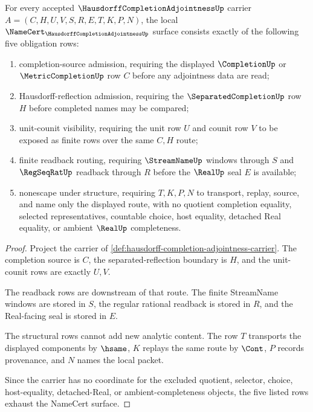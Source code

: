 \begin{theorem}
\label{thm:hausdorff-completion-adjointness-namecert-obligations}
For every accepted $\HausdorffCompletionAdjointnessUp$ carrier $A=(C,H,U,V,S,R,E,T,K,P,N)$, the local $\NameCert_{\HausdorffCompletionAdjointnessUp}$ surface consists exactly of the following five obligation rows:
\begin{enumerate}
\item completion-source admission, requiring the displayed $\CompletionUp$ or $\MetricCompletionUp$ row $C$ before any adjointness data are read;
\item Hausdorff-reflection admission, requiring the $\SeparatedCompletionUp$ row $H$ before completed names may be compared;
\item unit-counit visibility, requiring the unit row $U$ and counit row $V$ to be exposed as finite rows over the same $C,H$ route;
\item finite readback routing, requiring $\StreamNameUp$ windows through $S$ and $\RegSeqRatUp$ readback through $R$ before the $\RealUp$ seal $E$ is available;
\item nonescape under structure, requiring $T,K,P,N$ to transport, replay, source, and name only the displayed route, with no quotient completion equality, selected representatives, countable choice, host equality, detached Real equality, or ambient $\RealUp$ completeness.
\end{enumerate}
\end{theorem}
\begin{proof}
Project the carrier of \autoref{def:hausdorff-completion-adjointness-carrier}. The completion source is $C$, the separated-reflection boundary is $H$, and the unit-counit rows are exactly $U,V$.

The readback rows are downstream of that route. The finite StreamName windows are stored in $S$, the regular rational readback is stored in $R$, and the Real-facing seal is stored in $E$.

The structural rows cannot add new analytic content. The row $T$ transports the displayed components by $\hsame$, $K$ replays the same route by $\Cont$, $P$ records provenance, and $N$ names the local packet.

Since the carrier has no coordinate for the excluded quotient, selector, choice, host-equality, detached-Real, or ambient-completeness objects, the five listed rows exhaust the NameCert surface.
\end{proof}

